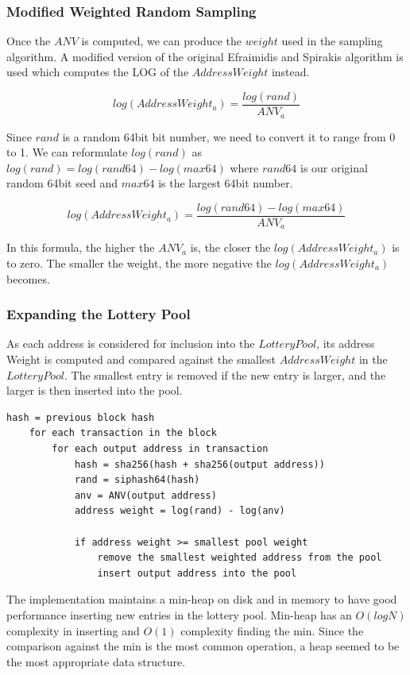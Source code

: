\documentclass{article}
\begin{document}
\subsubsection{Modified Weighted Random Sampling}
Once the $ANV$ is computed, we can produce the $weight$ used in the sampling algorithm.
A modified version of the original Efraimidis and Spirakis algorithm is used which computes
the LOG of the $AddressWeight$ instead.

$$log(AddressWeight_a) = \frac{log(rand)}{ANV_a}$$

Since $rand$ is a random 64bit bit number, we need to convert it to range from
0 to 1. We can reformulate $log(rand)$ as $log(rand) = log(rand64) - log(max64)$
where $rand64$ is our original random 64bit seed and $max64$ is the largest 64bit
number.

$$log(AddressWeight_a) = \frac{log(rand64) - log(max64)}{ANV_a}$$

In this formula, the higher the $ANV_a$ is, the closer the $log(AddressWeight_a)$ is
to zero. The smaller the weight, the more negative the $log(AddressWeight_a)$ becomes.


\subsubsection{Expanding the Lottery Pool}

As each address is considered for inclusion into the $LotteryPool$, its address
Weight is computed and compared against the smallest $AddressWeight$ in the
$LotteryPool$. The smallest entry is removed if the new entry is larger, and
the larger is then inserted into the pool.

\lstset{language=C}
\begin{lstlisting}[caption=Lottery Pool Pseudo Code]
    hash = previous block hash
    for each transaction in the block
        for each output address in transaction
            hash = sha256(hash + sha256(output address))
            rand = siphash64(hash)
            anv = ANV(output address)
            address weight = log(rand) - log(anv)

            if address weight >= smallest pool weight
                remove the smallest weighted address from the pool
                insert output address into the pool
\end{lstlisting}

The implementation maintains a min-heap on disk and in memory to have good performance 
inserting new entries in the lottery pool. Min-heap has an $O(log N)$ complexity
in inserting and $O(1)$ complexity finding the min. Since the comparison against
the min is the most common operation, a heap seemed to be the most appropriate
data structure.
\end{document}
